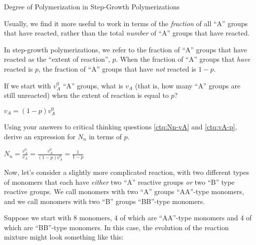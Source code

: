 \begin{activity}{Degree of Polymerization in Step-Growth Polymerizations}
\begin{ctqs}
\end{ctqs}
	
\begin{infobox}

Usually, we find it more useful to work in terms of the \emph{fraction} of all ``A'' groups that have reacted, rather than the total \emph{number} of ``A'' groups that have reacted.

In step-growth polymerizations, we refer to the fraction of ``A'' groups that have reacted as the ``extent of reaction'', $p$.
When the fraction of ``A'' groups that \emph{have} reacted is $p$, the fraction of ``A'' groups that have \emph{not} reacted is $1-p$.

\end{infobox}
	
\begin{ctqs}
		
		\question \label{ctq:vA-p} If we start with $v_A^0$ ``A'' groups, what is $v_A$ (that is, how many ``A'' groups are still unreacted) when the extent of reaction is equal to $p$?
		
		\begin{solution}[1in]
			$v_A = (1-p)v_A^0$
		\end{solution}
		
		\question Using your answers to critical thinking questions \ref{ctq:Nn-vA} and \ref{ctq:vA-p}, derive an expression for $N_n$ in terms of $p$.
		
		\begin{solution}[1in]
			$N_n = \frac{v_A^0}{v_A} = \frac{v_A^0}{(1-p)v_A^0} = \frac{1}{1-p}$
		\end{solution}
		
\end{ctqs}

\clearpage
\begin{model}
\label{\labelbase:mdl:AABBpolym}

Now, let's consider a slightly more complicated reaction, with two different types of monomers that each have \emph{either} two ``A'' reactive groups \emph{or} two ``B'' type reactive groups.
We call monomers with two ``A'' groups ``AA''-type monomers, and we call monomers with two ``B'' groups ``BB''-type monomers.

Suppose we start with 8 monomers, 4 of which are ``AA''-type monomers and 4 of which are ``BB''-type monomers.
In this case, the evolution of the reaction mixture might look something like this:


\end{model}
\end{activity}
